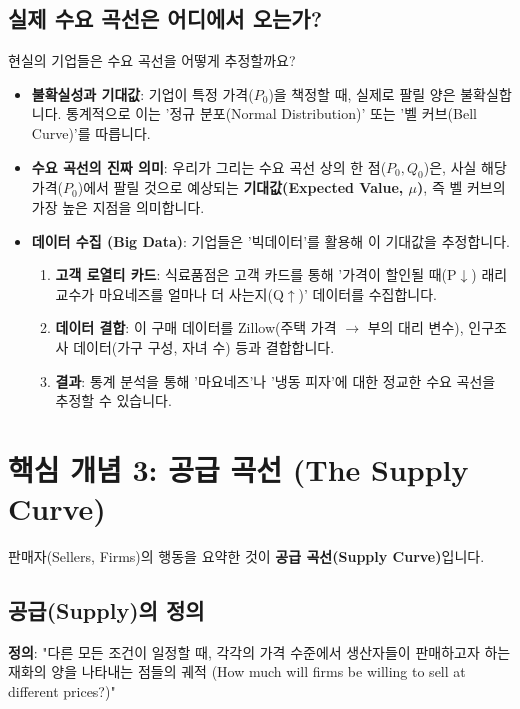 \documentclass[11pt,a4paper]{book}
\theoremstyle{definition}
\begin{document}
\subsection{실제 수요 곡선은 어디에서 오는가?}

현실의 기업들은 수요 곡선을 어떻게 추정할까요?

\begin{itemize}
    \item \textbf{불확실성과 기대값}: 기업이 특정 가격($P_0$)을 책정할 때, 실제로 팔릴 양은 불확실합니다. 통계적으로 이는 '정규 분포(Normal Distribution)' 또는 '벨 커브(Bell Curve)'를 따릅니다.
    \item \textbf{수요 곡선의 진짜 의미}: 우리가 그리는 수요 곡선 상의 한 점($P_0, Q_0$)은, 사실 해당 가격($P_0$)에서 팔릴 것으로 예상되는 \textbf{기대값(Expected Value, $\mu$)}, 즉 벨 커브의 가장 높은 지점을 의미합니다.
    \item \textbf{데이터 수집 (Big Data)}: 기업들은 '빅데이터'를 활용해 이 기대값을 추정합니다.
        \begin{enumerate}
            \item \textbf{고객 로열티 카드}: 식료품점은 고객 카드를 통해 '가격이 할인될 때(P$\downarrow$) 래리 교수가 마요네즈를 얼마나 더 사는지(Q$\uparrow$)' 데이터를 수집합니다.
            \item \textbf{데이터 결합}: 이 구매 데이터를 Zillow(주택 가격 $\to$ 부의 대리 변수), 인구조사 데이터(가구 구성, 자녀 수) 등과 결합합니다.
            \item \textbf{결과}: 통계 분석을 통해 '마요네즈'나 '냉동 피자'에 대한 정교한 수요 곡선을 추정할 수 있습니다.
        \end{enumerate}
\end{itemize}


\section{핵심 개념 3: 공급 곡선 (The Supply Curve)}

판매자(Sellers, Firms)의 행동을 요약한 것이 \textbf{공급 곡선(Supply Curve)}입니다.

\subsection{공급(Supply)의 정의}

\textbf{정의}: "다른 모든 조건이 일정할 때, 각각의 가격 수준에서 생산자들이 판매하고자 하는 재화의 양을 나타내는 점들의 궤적 (How much will firms be willing to sell at different prices?)"
\end{document}
